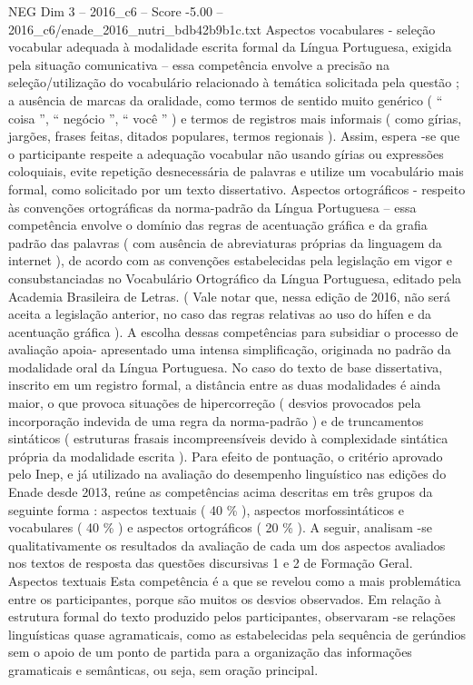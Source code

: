 \begin{textsample}{NEG Dim 3 – 2016\_c6 – Score -5.00 – 2016\_c6/enade\_2016\_nutri\_bdb42b9b1c.txt}
Aspectos vocabulares - seleção vocabular adequada à modalidade escrita formal da Língua Portuguesa, exigida pela situação comunicativa – essa competência envolve a precisão na seleção/utilização do vocabulário relacionado à temática solicitada pela questão ; a ausência de marcas da oralidade, como termos de sentido muito genérico ( “ coisa ”, “ negócio ”, “ você ” ) e termos de registros mais informais ( como gírias, jargões, frases feitas, ditados populares, termos regionais ).
Assim, espera -se que o participante respeite a adequação vocabular não usando gírias ou expressões coloquiais, evite repetição desnecessária de palavras e utilize um vocabulário mais formal, como solicitado por um texto dissertativo.
Aspectos ortográficos - respeito às convenções ortográficas da norma-padrão da Língua Portuguesa – essa competência envolve o domínio das regras de acentuação gráfica e da grafia padrão das palavras ( com ausência de abreviaturas próprias da linguagem da internet ), de acordo com as convenções estabelecidas pela legislação em vigor e consubstanciadas no Vocabulário Ortográfico da Língua Portuguesa, editado pela Academia Brasileira de Letras. ( Vale notar que, nessa edição de 2016, não será aceita a legislação anterior, no caso das regras relativas ao uso do hífen e da acentuação gráfica ).
A escolha dessas competências para subsidiar o processo de avaliação apoia- apresentado uma intensa simplificação, originada no padrão da modalidade oral da Língua Portuguesa.
No caso do texto de base dissertativa, inscrito em um registro formal, a distância entre as duas modalidades é ainda maior, o que provoca situações de hipercorreção ( desvios provocados pela incorporação indevida de uma regra da norma-padrão ) e de truncamentos sintáticos ( estruturas frasais incompreensíveis devido à complexidade sintática própria da modalidade escrita ).
Para efeito de pontuação, o critério aprovado pelo Inep, e já utilizado na avaliação do desempenho linguístico nas edições do Enade desde 2013, reúne as competências acima descritas em três grupos da seguinte forma : aspectos textuais ( 40 \% ), aspectos morfossintáticos e vocabulares ( 40 \% ) e aspectos ortográficos ( 20 \% ).
A seguir, analisam -se qualitativamente os resultados da avaliação de cada um dos aspectos avaliados nos textos de resposta das questões discursivas 1 e 2 de Formação Geral.
Aspectos textuais Esta competência é a que se revelou como a mais problemática entre os participantes, porque são muitos os desvios observados.
Em relação à estrutura formal do texto produzido pelos participantes, observaram -se relações linguísticas quase agramaticais, como as estabelecidas pela sequência de gerúndios sem o apoio de um ponto de partida para a organização das informações gramaticais e semânticas, ou seja, sem oração principal.

\end{textsample}
